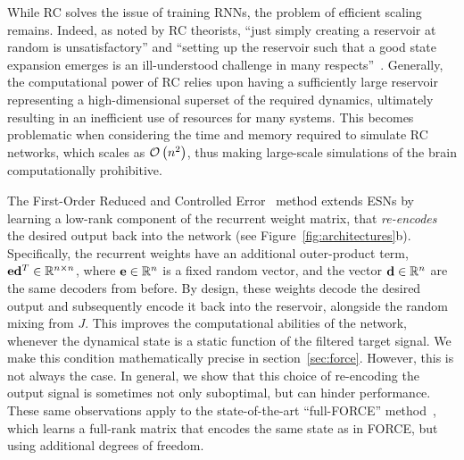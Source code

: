 While RC solves the issue of training RNNs, the problem of efficient scaling remains. 
Indeed, as noted by RC theorists, ``just simply creating a reservoir at random is unsatisfactory'' and ``setting up the reservoir such that a good state expansion emerges is an ill-understood challenge in many respects''~\citep{lukovsevicius2012reservoir}.
Generally, the computational power of RC relies upon having a sufficiently large reservoir representing a high-dimensional superset of the required dynamics, ultimately resulting in an inefficient use of resources for many systems.
This becomes problematic when considering the time and memory required to simulate RC networks, which scales as $\mathcal{O}\left({ n^2 }\right)$, thus making large-scale simulations of the brain computationally prohibitive.

The First-Order Reduced and Controlled Error~\citep[FORCE;][]{sussillo2009generating} method extends ESNs by learning a low-rank component of the recurrent weight matrix, that {\it re-encodes} the desired output back into the network (see Figure~\ref{fig:architectures}b).
Specifically, the recurrent weights have an additional outer-product term, $\mathbf{e} \mathbf{d}^T \in \mathbb{R}^{n \times n}$, where $\mathbf{e} \in \mathbb{R}^n$ is a fixed random vector, and the vector $\mathbf{d} \in \mathbb{R}^n$ are the same decoders from before.
By design, these weights decode the desired output and subsequently encode it back into the reservoir, alongside the random mixing from $J$.
This improves the computational abilities of the network, whenever the dynamical state is a static function of the filtered target signal.
We make this condition mathematically precise in section~\ref{sec:force}.
However, this is not always the case. In general, we show that this choice of re-encoding the output signal is sometimes not only suboptimal, but can hinder performance.
These same observations apply to the state-of-the-art ``full-FORCE'' method~\citep{depasquale2018full}, which learns a full-rank matrix that encodes the same state as in FORCE, but using additional degrees of freedom.

